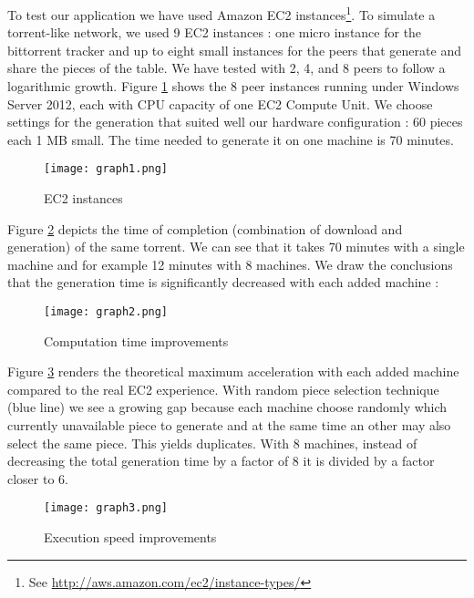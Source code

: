 \documentclass[a4paper]{article}
\begin{document}
{To test our application we have used Amazon EC2 instances\footnote{See \url{http://aws.amazon.com/ec2/instance-types/}}. To simulate a torrent-like network, we used 9 EC2 instances : one micro instance for the bittorrent tracker and up to eight small instances for the peers that generate and share the pieces of the table. We have tested with 2, 4, and 8 peers to follow a logarithmic growth. Figure \ref{graph1} shows the 8 peer instances running under Windows Server 2012, each with CPU capacity of one EC2 Compute Unit. We choose settings for the generation that suited well our hardware configuration : 60 pieces each 1 MB small. The time needed to generate it on one machine is 70 minutes.

\vspace{3mm}
\begin{figure}[H]
  \centering
    \texttt{[image: graph1.png]}
    \caption{EC2 instances}
    \label{graph1}
\end{figure}
\vspace{2mm}

Figure \ref{graph2} depicts the time of completion (combination of download and generation) of the same torrent. We can see that it takes 70 minutes with a single machine and for example 12 minutes with 8 machines. We draw the conclusions that the generation time is significantly decreased with each added machine :

\vspace{3mm}
\begin{figure}[H]
  \centering
    \texttt{[image: graph2.png]}
    \caption{Computation time improvements}
    \label{graph2}
\end{figure}
\vspace{2mm}

Figure \ref{graph3} renders the theoretical maximum acceleration with each added machine compared to the real EC2 experience. With random piece selection technique (blue line) we see a growing gap because each machine choose randomly which currently unavailable piece to generate and at the same time an other may also select the same piece. This yields duplicates. With 8 machines, instead of decreasing the total generation time by a factor of 8 it is divided by a factor closer to 6.

\vspace{3mm}
\begin{figure}[H]
  \centering
    \texttt{[image: graph3.png]}
    \caption{Execution speed improvements}
    \label{graph3}
\end{figure}
\vspace{2mm}


}
\end{document}
